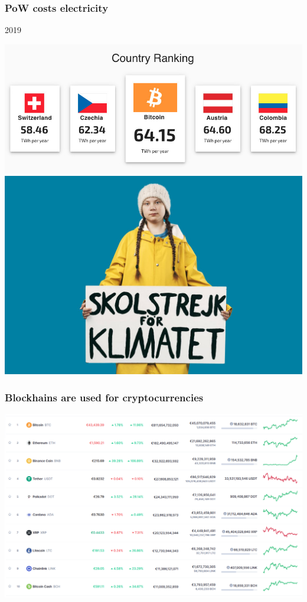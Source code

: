 \documentclass[11pt]{beamer}  %
\begin{document}
\begin{frame}\frametitle{PoW costs electricity}

  \begin{greenbox}{2019}
    \begin{center}
      \includegraphics[scale=0.17,clip=false]{pictures/bitcoin-consumption.jpg}
      \includegraphics[scale=0.14,clip=false]{pictures/greta.jpg}
    \end{center}
  \end{greenbox}
    
\end{frame}

\begin{frame}\frametitle{Blockhains are used for cryptocurrencies}

  \begin{center}
    \includegraphics[scale=0.258,clip=false]{pictures/market.png}
  \end{center}

\end{frame}
\end{document}
